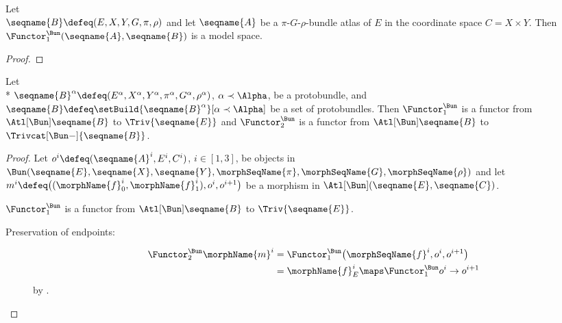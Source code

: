 \documentclass{article}
\begin{document}
\begin{lemma}
\label{lem:ismodT}
Let \\
$
  \seqname{B}
  \defeq
  (
    E,
    X,
    Y,
    G,
    \pi,
    \rho
  )
$
and let $\seqname{A}$ be a $\pi$-$G$-$\rho$-bundle atlas of $E$ in the
coordinate space $C = X \times Y$. Then
$\Functor^\Bun_1 (\seqname{A}, \seqname{B})$ is a model space.

\begin{proof}
\end{proof}
\end{lemma}

\begin{theorem}
\label{the:FuncBuntoMod}
Let \\*
$
  \seqname{B}^\alpha \defeq
  (E^\alpha, X^\alpha, Y^\alpha, \pi^\alpha, G^\alpha, \rho^\alpha)
$,
$\alpha \prec \Alpha$, be a protobundle, and
$\seqname{B} \defeq \setBuild{{\seqname{B}^\alpha}}[\alpha \prec \Alpha]$
be a set of protobundles. Then
$\Functor^\Bun_1$ is a functor from
$\Atl[\Bun] \seqname{B}$ to $\Triv{\seqname{E}}$ and
$\Functor^\Bun_2$ is a functor from
$\Atl[\Bun] \seqname{B}$ to $\Trivcat[\Bun-]{\seqname{B}}$.

\begin{proof}
Let $o^i \defeq (\seqname{A}^i, E^i, C^i)$, $i \in [1,3]$, be
objects in
$
\Bun
  (
    \seqname{E},
    \seqname{X},
    \seqname{Y},
    \morphSeqName{\pi},
    \morphSeqName{G},
    \morphSeqName{\rho}
  )
$
and let
$
m^i \defeq
  \bigl (
    (\morphName{f}^i_0, \morphName{f}^i_1),
    o^i,
    o^{i+1}
  \bigr )
$
be a morphism in $\Atl[\Bun](\seqname{E}, \seqname{C})$.

$\Functor^\Bun_1$ is a functor from $\Atl[\Bun] \seqname{B}$ to
$\Triv{\seqname{E}}$.
\begin{description}
\item[Preservation of endpoints:]
\begin{align*}
  \Functor^\Bun_2 \morphName{m}^i
  & =
  \Functor^\Bun_1
    \bigl (
      \morphSeqName{f}^i,
      o^i,
      o^{i+1}
    \bigr )
\\*
  & =
  \morphName{f}^i_E \maps \Functor^\Bun_1 o^i \to o^{i+1}
\end{align*}
by .


\end{description}
\end{proof}
\end{theorem}
\end{document}
